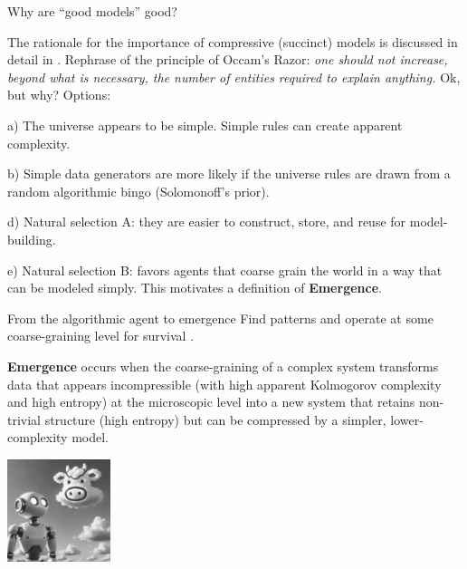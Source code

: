 \begin{frame}[label=ladila]{Why are ``good models'' good?}

The rationale for the importance of compressive (succinct) models is discussed in detail in \cite{Ruffini:2007aa,Ruffini:2009aa,Ruffini2017}.  Rephrase of the principle of Occam’s Razor: {\em
one should not increase, beyond what is necessary, the number of entities required to explain anything.}  Ok, but why? Options:\vfill

a) The universe appears to be simple. Simple rules can create apparent complexity.\vfill


b) Simple data generators are more likely if the universe rules are drawn from a random algorithmic bingo (Solomonoff's prior). \vfill


d) Natural selection A: they are easier to construct,  store,  and reuse for model-building. \vfill

e) Natural selection B: favors agents that coarse grain the world in a way that can be modeled simply. This motivates a definition of \textbf{Emergence}.


\end{frame}

\begin{frame}[label=emergence]{From the algorithmic agent to emergence}
Find patterns and operate at some coarse-graining level for survival \cite{ruffiniNavigatingComplexityHow2024}.

\begin{definition}
  \textbf{Emergence} occurs when the coarse-graining of a complex system transforms data that appears incompressible (with high apparent Kolmogorov complexity and high entropy) at the microscopic level into a new system that retains non-trivial structure (high entropy) but can be compressed by a simpler, lower-complexity model.  
\end{definition}

\begin{center}%
  \includegraphics[height=3cm]{img/robot_emergence.png}
  \end{center}

\end{frame}


